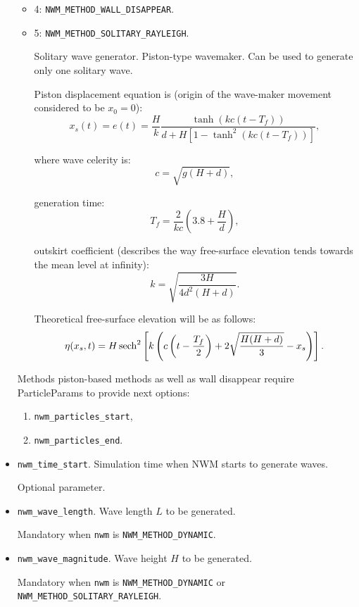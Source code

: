 \begin{itemize}
\begin{itemize}
        \item 4: \verb|NWM_METHOD_WALL_DISAPPEAR|.
        \item 5: \verb|NWM_METHOD_SOLITARY_RAYLEIGH|.

        Solitary wave generator. 
        Piston-type wavemaker. 
        Can be used to generate only one solitary wave.

        Piston displacement equation is (origin of the wave-maker movement considered to be $x_{0}=0$):
        \begin{equation}
            x_{s}(t)=e(t)=\frac{H}{k}
            \frac{\tanh(kc(t-T_{f}))}
            {d+H\left[1-\tanh^{2}(kc(t-T_{f}))\right]},
        \end{equation}

        where wave celerity is:
        \begin{equation}
            c=\sqrt{g(H+d)},
        \end{equation}

        generation time:
        \begin{equation}
            T_{f} = \frac{2}{kc}
            \left(
            3.8+\frac{H}{d}
            \right),
        \end{equation}

        outskirt coefficient (describes the way free-surface elevation tends towards the mean level at infinity):
        \begin{equation}
            k=\sqrt{\frac{3H}{4d^{2}(H+d)}}.
        \end{equation}

        Theoretical free-surface elevation will be as follows:
        \begin{equation}
            \eta(x_{s},t)=H \operatorname{sech}^{2}
            \left[
            k \left(
            c\left(t - \frac{T_{f}}{2} \right)
            +
            2\sqrt{\frac{H(H+d)}{3}} - x_{s}
            \right)
            \right].
        \end{equation}
    \end{itemize}
    Methods piston-based methods as well as wall disappear require ParticleParams to provide next options:
    \begin{enumerate}
        \item \verb|nwm_particles_start|,
        \item \verb|nwm_particles_end|.
    \end{enumerate}

    \item \verb|nwm_time_start|. Simulation time when NWM starts to generate waves.
    
    Optional parameter.
    \item \verb|nwm_wave_length|. Wave length $L$ to be generated.
    
    Mandatory when \verb|nwm| is \verb|NWM_METHOD_DYNAMIC|.
    \item \verb|nwm_wave_magnitude|. Wave height $H$ to be generated.
    
    Mandatory when \verb|nwm| is \verb|NWM_METHOD_DYNAMIC| or \verb|NWM_METHOD_SOLITARY_RAYLEIGH|.
\end{itemize}

